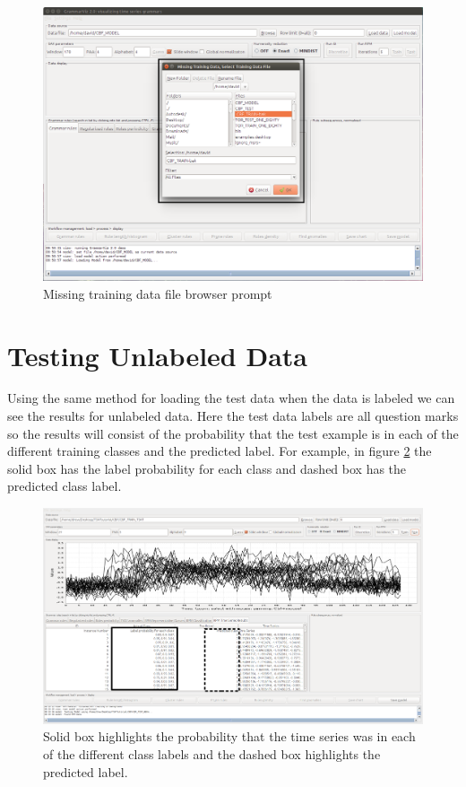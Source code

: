 \documentclass[letterpaper, 12pt]{article}
\begin{document}
\begin{figure}[H]
  \includegraphics[width=\textwidth]{TSAT-load-model-failed-data}
  \caption{Missing training data file browser prompt}
  \label{fig:TSAT-load-model-failed-data}
\end{figure}

\newpage
\section{Testing Unlabeled Data}
Using the same method for loading the test data when the data is labeled we can see the results for unlabeled data.  Here the test data labels are all question marks so the results will consist of the probability that the test example is in each of the different training classes and the predicted label.  For example, in figure \ref{fig:TSAT-Results-Unknown-Test} the solid box has the label probability for each class and dashed box has the predicted class label.
\begin{figure}[H]
	\includegraphics[width=\textwidth]{RPMTimeSeriesResultsUnknown}
	\caption{Solid box highlights the probability that the time series was in each of the different class labels and the dashed box highlights the predicted label.}
	\label{fig:TSAT-Results-Unknown-Test}
\end{figure}
\end{document}
